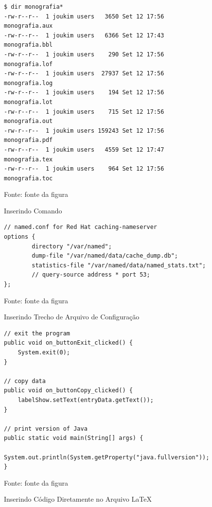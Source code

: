 \begin{figure}[!htb]
\centering
\caption{Inserindo Comando} %
\vspace{-12pt} %
\begin{Verbatim}[frame=single]
$ dir monografia*
-rw-r--r--  1 joukim users   3650 Set 12 17:56 monografia.aux
-rw-r--r--  1 joukim users   6366 Set 12 17:43 monografia.bbl
-rw-r--r--  1 joukim users    290 Set 12 17:56 monografia.lof
-rw-r--r--  1 joukim users  27937 Set 12 17:56 monografia.log
-rw-r--r--  1 joukim users    194 Set 12 17:56 monografia.lot
-rw-r--r--  1 joukim users    715 Set 12 17:56 monografia.out
-rw-r--r--  1 joukim users 159243 Set 12 17:56 monografia.pdf
-rw-r--r--  1 joukim users   4559 Set 12 17:47 monografia.tex
-rw-r--r--  1 joukim users    964 Set 12 17:56 monografia.toc
\end{Verbatim} 
\vspace{-12pt}
{\small Fonte: fonte da figura} %
\label{fig:exemplocomando} %
\end{figure}

\begin{figure}[!htb]
\centering
\caption{Inserindo Trecho de Arquivo de Configuração} %
\label{fig:exemploconfig} %
\vspace{-12pt}
\begin{Verbatim}[frame=single]
// named.conf for Red Hat caching-nameserver
options {
        directory "/var/named";
        dump-file "/var/named/data/cache_dump.db";
        statistics-file "/var/named/data/named_stats.txt";
        // query-source address * port 53;
};
\end{Verbatim} 
\vspace{-12pt}
{\small Fonte: fonte da figura} %
\end{figure}


\begin{figure}[!htb]
\centering
\caption{Inserindo Código Diretamente no Arquivo \LaTeX} %
\begin{lstlisting}
// exit the program
public void on_buttonExit_clicked() {
	System.exit(0);
}

// copy data
public void on_buttonCopy_clicked() {
	labelShow.setText(entryData.getText());
}

// print version of Java
public static void main(String[] args) {
	System.out.println(System.getProperty("java.fullversion"));
}
\end{lstlisting} 
{\small Fonte: fonte da figura} %
\label{fig:exemplocodigo1} %
\end{figure}


